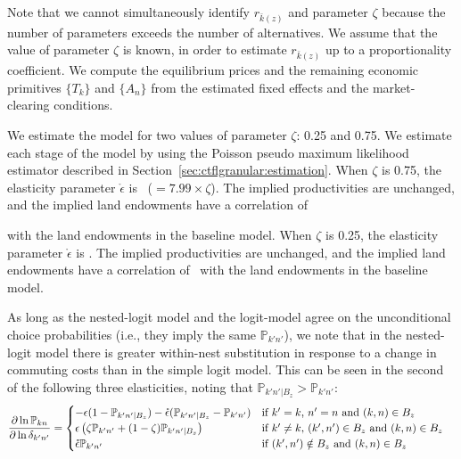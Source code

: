 \documentclass[11pt]{article}
\theoremstyle{definition}
\begin{document}
Note that we cannot simultaneously identify $r_{\bar{k}(z)}$ and parameter $\zeta$ because 
the number of parameters exceeds the number of alternatives. We assume that the value of parameter $\zeta$ is known, in order to estimate $r_{\bar{k}(z)}$ up to a proportionality coefficient.
We compute the equilibrium prices and the remaining economic primitives $\{T_k\}$ and $\{A_n\}$
from the estimated fixed effects and the market-clearing conditions.

We estimate the model for two values of parameter $\zeta$: 0.25 and 0.75.
We estimate each stage of the model by using the
Poisson pseudo maximum likelihood estimator described in Section~\ref{sec:ctflgranular:estimation}.%
When $\zeta$ is 0.75, 
the elasticity parameter $\mathring{\epsilon}$ is
\unskip\
($=7.99 \times \zeta$).
The implied productivities are unchanged,
and the implied land endowments have a correlation of

with the land endowments in the baseline model.
When $\zeta$ is 0.25, 
the elasticity parameter $\mathring{\epsilon}$ is
\unskip.
The implied productivities are unchanged,
and the implied land endowments have a correlation of 
\unskip\
with the land endowments in the baseline model.

As long as the nested-logit model and the logit-model agree on the unconditional choice probabilities (i.e., they imply the same $\mathbb{P}_{k'n'}$),
we note that in the nested-logit model there is greater within-nest substitution in response to a change in commuting costs than in the simple logit model.
This can be seen in the second of the following three elasticities, noting that $\mathbb{P}_{k'n'\vert B_z} > \mathbb{P}_{k'n'}$:
\newcommand{\ppx}[2]{\ensuremath\frac{\partial #1}{\partial #2}}
\renewcommand{\Pr}{\mathbb{P}}
\begin{align*}
   \ppx{\ln \Pr_{kn}}{\ln \delta_{k'n'}} &= \begin{cases}
            -\epsilon(1 - \Pr_{k'n'\vert B_z}) - \mathring{\epsilon}(\Pr_{k'n'\vert B_z} - \Pr_{k'n'}) & \text{if } k' = k \text{, } n' = n \text{ and } (k,n) \in  B_z \\
            \epsilon \left(  \zeta \Pr_{k'n'} + (1-\zeta)   \Pr_{k'n'\vert B_z}  \right)        & \text{if }  k' \neq k \text{, } (k',n') \in B_z \text{ and } (k,n) \in B_z \\
            \mathring{\epsilon}\Pr_{k'n'}                                                                & \text{if } (k',n') \notin B_z  \text{ and } (k,n) \in B_z 
\end{cases}
\end{align*}
\end{document}
